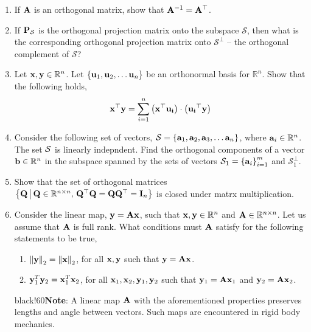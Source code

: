 \documentclass[
11pt, %
a4paper, %
oneside, %
headinclude,footinclude, %
BCOR5mm, %
]{scrartcl}
\def\mf{\ensuremath\mathbf}
\def\mb{\ensuremath\mathbb}
\begin{document}
\begin{enumerate}
	\item If $\mf{A}$ is an orthogonal matrix, show that $\mf{A}^{-1} = \mf{A}^\top$.
	
	\item If $\mf{P}_{\mathcal{S}}$ is the orthogonal projection matrix onto the subspace $\mathcal{S}$, then what is the corresponding orthogonal projection matrix onto $\mathcal{S}^{\perp}$ -- the orthogonal complement of $\mathcal{S}$?
	
	\item Let $\mf{x}, \mf{y} \in \mathbb{R}^n$. Let $\cc{\mf{u}_1, \mf{u}_2, \ldots \mf{u}_n}$ be an orthonormal basis for $\mathbb{R}^n$. Show that the following holds,
	\[ \mf{x}^\top\mf{y} = \sum_{i=1}^n \pp{\mf{x}^\top \mf{u_i}} \cdot \pp{\mf{u_i}^\top \mf{y}} \]
	
	\item Consider the following set of vectors, $\mathcal{S} = \left\{ \mf{a}_1, \mf{a}_2, \mf{a}_3, \ldots \mf{a}_n \right\}$, where $\mf{a}_i \in \mathbb{R}^n$. The set $\mathcal{S}$ is linearly indepndent. Find the orthogonal components of a vector $\mf{b} \in \mathbb{R}^n$ in the subspace spanned by the sets of vectors $\mathcal{S}_1 = \left\{ \mf{a}_i \right\}_{i=1}^m$ and $\mathcal{S}_1^\perp$.
	
	\item Show that the set of orthogonal matrices $\left\{ \mf{Q} \, \big \vert \, \mf{Q} \in \mb{R}^{n \times n}, \, \mf{Q}^\top\mf{Q} = \mf{Q}\mf{Q}^\top = \mf{I}_n  \right\}$ is closed under matrx multiplication.
	
    \item Consider the linear map, $\mf{y} = \mf{Ax}$, such that $\mf{x}, \mf{y} \in \mb{R}^n$ and $\mf{A} \in \mb{R}^{n \times n}$. Let us assume that $\mf{A}$ is full rank. What conditions must $\mf{A}$ satisfy for the following statements to be true,
    \begin{enumerate}
        \item $\left\lVert \mf{y}\right\rVert_2 = \left\lVert \mf{x}\right\rVert_2$, for all $\mf{x}, \mf{y}$ such that $\mf{y} = \mf{Ax}$.
        \item $\mf{y}_1^T\mf{y}_2 = \mf{x}_1^T\mf{x}_2$, for all $\mf{x}_1, \mf{x}_2, \mf{y}_1, \mf{y}_2$ such that $\mf{y}_1 = \mf{A}\mf{x}_1$ and $\mf{y}_2 = \mf{A}\mf{x}_2$. 
    \end{enumerate}
    \vspace{-0.1cm}
    \begin{color}{black!60}\small{\textbf{Note}: A linear map $\mf{A}$ with the aforementioned properties preserves lengths and angle between vectors. Such maps are encountered in rigid body mechanics.}
    \end{color}
\end{enumerate}
\end{document}
